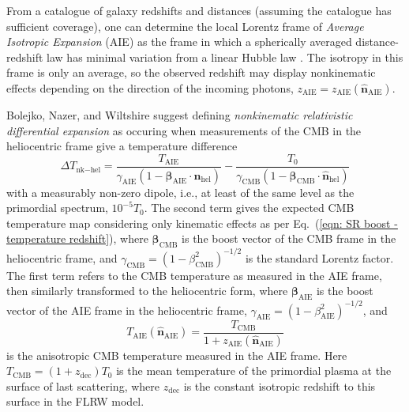 \documentclass[a4paper,12pt]{report}
\newcommand{\uvec}[1]{\hat{\bm{#1}}}
\renewcommand{\vec}[1]{\ensuremath{\bm{#1}}}
\newcommand{\AIE}{_\text{AIE}}
\newcommand{\CMB}{_\text{CMB}}
\renewcommand{\eqref}[1]{Eq.~({#1})}
\begin{document}
From a catalogue of galaxy redshifts and distances (assuming the catalogue has sufficient coverage), one can determine the local Lorentz frame of \textit{Average Isotropic Expansion} (AIE) as the frame in which a spherically averaged distance-redshift law has minimal variation from a linear Hubble law \cite{RN35,RN40,RN122}. The isotropy in this frame is only an average, so the observed redshift may display nonkinematic effects depending on the direction of the incoming photons, $z\AIE = z\AIE(\uvec{n}\AIE)$.

Bolejko, Nazer, and Wiltshire \cite{RN3} suggest defining \textit{nonkinematic relativistic differential expansion} as occuring when measurements of the CMB in the heliocentric frame give a temperature difference
\begin{equation}\label{eqn: non kinematic relativistic differential expansion BNW definition}
  \Delta T_{\text{nk}-\text{hel}} = \frac{T\AIE}{\gamma\AIE(1-\vec{\beta}\AIE \cdot \uvec{n}_\text{hel})}-
  \frac{T_0}{\gamma\CMB(1-\vec{\beta}\CMB \cdot \uvec{n}_\text{hel})}
\end{equation}
with a measurably non-zero dipole, i.e., at least of the same level as the primordial spectrum, $10^{-5}T_0$. The second term gives the expected CMB temperature map considering only kinematic effects as per \eqref{\ref{eqn: SR boost - temperature redshift}}, where $\vec{\beta}\CMB$ is the boost vector of the CMB frame in the heliocentric frame, and $\gamma\CMB = (1-\beta^2\CMB)^{-1/2}$ is the standard Lorentz factor. The first term refers to the CMB temperature as measured in the AIE frame, then similarly transformed to the heliocentric form, where $\vec{\beta}\AIE$ is the boost vector of the AIE frame in the heliocentric frame, $\gamma\AIE = (1-\beta^2\AIE)^{-1/2}$, and
\begin{equation}
  T\AIE (\uvec{n}\AIE) = \frac{T\CMB}{1+z\AIE(\uvec{n}\AIE)}
\end{equation}
is the anisotropic CMB temperature measured in the AIE frame. Here $T\CMB = (1+z_\text{dec})T_0$ is the mean temperature of the primordial plasma at the surface of last scattering, where $z_\text{dec}$ is the constant isotropic redshift to this surface in the FLRW model.
\end{document}
